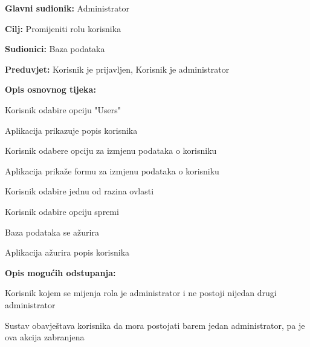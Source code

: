 					\noindent {}
					\begin{packed_item}

						\item \textbf{Glavni sudionik:} Administrator
						\item \textbf{Cilj:} Promijeniti rolu korisnika
						\item \textbf{Sudionici:} Baza podataka
						\item \textbf{Preduvjet:} Korisnik je prijavljen, Korisnik je administrator
						\item \textbf{Opis osnovnog tijeka:}

						\item[] \begin{packed_enum}

							\item Korisnik odabire opciju "Users"
							\item Aplikacija prikazuje popis korisnika
							\item Korisnik odabere opciju za izmjenu podataka o korisniku
							\item Aplikacija prikaže formu za izmjenu podataka o korisniku
							\item Korisnik odabire jednu od razina ovlasti
							\item Korisnik odabire opciju spremi
							\item Baza podataka se ažurira
							\item Aplikacija ažurira popis korisnika

						\end{packed_enum}

						\item \textbf{Opis mogućih odstupanja:}

						\item[] \begin{packed_item}

							\item[3.a] Korisnik kojem se mijenja rola je administrator i ne postoji nijedan
							drugi administrator
							\item[] \begin{packed_enum}

								\item Sustav obavještava korisnika da mora postojati
								barem jedan administrator, pa je ova akcija zabranjena

							\end{packed_enum}

						\end{packed_item}
					\end{packed_item}

